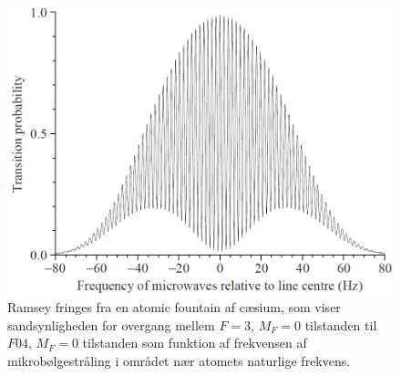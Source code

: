 \begin{figure}[!h]
    \centering
    \includegraphics[width=.6\textwidth]{Q04/images/RamseyFringes.PNG}
    \caption{Ramsey fringes fra en atomic fountain af cæsium, som viser sandsynligheden for overgang mellem $F = 3$, $M_F = 0$ tilstanden til $F 0 4$, $M_F = 0$ tilstanden som funktion af frekvensen af mikrobølgestråling i området nær atomets naturlige frekvens.}
    \label{fig:Q04_RamseyFringes}
\end{figure}